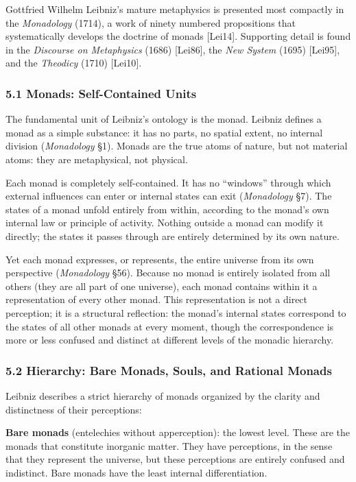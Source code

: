 \documentclass[
  11pt,
  letterpaper,
]{article}
\begin{document}
Gottfried Wilhelm Leibniz's mature metaphysics is presented most
compactly in the \emph{Monadology} (1714), a work of ninety numbered
propositions that systematically develops the doctrine of monads
{[}Lei14{]}. Supporting detail is found in the \emph{Discourse on
Metaphysics} (1686) {[}Lei86{]}, the \emph{New System} (1695)
{[}Lei95{]}, and the \emph{Theodicy} (1710) {[}Lei10{]}.

\subsubsection{5.1 Monads: Self-Contained
Units}\label{monads-self-contained-units}

The fundamental unit of Leibniz's ontology is the monad. Leibniz defines
a monad as a simple substance: it has no parts, no spatial extent, no
internal division (\emph{Monadology} §1). Monads are the true atoms of
nature, but not material atoms: they are metaphysical, not physical.

Each monad is completely self-contained. It has no ``windows'' through
which external influences can enter or internal states can exit
(\emph{Monadology} §7). The states of a monad unfold entirely from
within, according to the monad's own internal law or principle of
activity. Nothing outside a monad can modify it directly; the states it
passes through are entirely determined by its own nature.

Yet each monad expresses, or represents, the entire universe from its
own perspective (\emph{Monadology} §56). Because no monad is entirely
isolated from all others (they are all part of one universe), each monad
contains within it a representation of every other monad. This
representation is not a direct perception; it is a structural
reflection: the monad's internal states correspond to the states of all
other monads at every moment, though the correspondence is more or less
confused and distinct at different levels of the monadic hierarchy.

\subsubsection{5.2 Hierarchy: Bare Monads, Souls, and Rational
Monads}\label{hierarchy-bare-monads-souls-and-rational-monads}

Leibniz describes a strict hierarchy of monads organized by the clarity
and distinctness of their perceptions:

\textbf{Bare monads} (entelechies without apperception): the lowest
level. These are the monads that constitute inorganic matter. They have
perceptions, in the sense that they represent the universe, but these
perceptions are entirely confused and indistinct. Bare monads have the
least internal differentiation.
\end{document}
